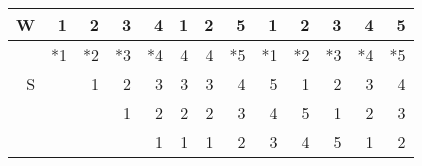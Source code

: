 \documentclass{standalone}
\begin{document}
\begin{tabular}{r|rrrrrrrrrrrr}
W & 1 & 2 & 3 & 4 & 1 & 2 & 5 & 1 & 2 & 3 & 4 & 5 \\
\hline
  & *1 & *2 & *3 & *4 &  4 &  4 & *5 & *1 & *2 & *3 & *4 & *5 \\
S &    &  1 &  2 &  3 &  3 &  3 &  4 &  5 &  1 &  2 &  3 &  4 \\
  &    &    &  1 &  2 &  2 &  2 &  3 &  4 &  5 &  1 &  2 &  3 \\
  &    &    &    &  1 &  1 &  1 &  2 &  3 &  4 &  5 &  1 &  2 \\
\end{tabular}
\end{document}
